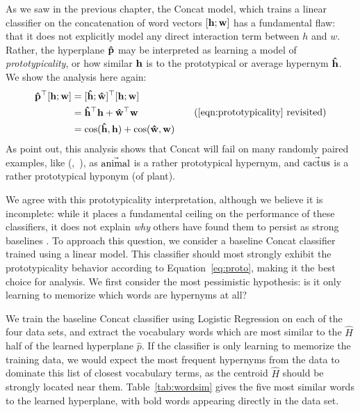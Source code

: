 As we saw in the previous chapter, the Concat model, which trains a linear
classifier on the concatenation of word vectors $[{\mathbf{h}}; {\mathbf{w}}]$ has a fundamental
flaw: that it does not explicitly model any direct interaction term between
$h$ and $w$. Rather, the hyperplane ${\mathbf{\hat p}}$ may be interpreted as learning
a model of {\em prototypicality}, or how similar ${\mathbf{h}}$ is to the prototypical
or average hypernym ${\mathbf{\hat h}}$. We show the analysis here again:
\begin{align}
  \begin{split}
  \vhatp^\top \wordpair & = \protopair^\top \wordpair\\
  & = \vhath^\top\vh + \vhatw^\top\vw\\
  & = \mbox{cos}(\vhath, \vh) + \mbox{cos}(\vhatw, \vw)
  \end{split}
\tag{\ref{eqn:prototypicality} revisited}
\end{align}
As  point out, this analysis shows that Concat will
fail on many randomly paired examples, like (,~), as
$\vec{\mbox{animal}}$ is a rather prototypical hypernym, and $\vec{\mbox{cactus}}$ is
a rather prototypical hyponym (of plant).

We agree with this prototypicality interpretation, although we believe it is incomplete:
while it places a fundamental ceiling on the performance of these classifiers, it
does not explain {\em why} others have found them to persist as strong
baselines
\cite{weeds:2014:coling,roller:2014:coling,kruszewski:2015:tacl,vylomova:2016:acl}.
To approach this question, we consider a baseline Concat classifier trained
using a linear model. This classifier should most strongly exhibit the prototypicality
behavior according to Equation~\ref{eq:proto}, making it the best
choice for analysis. We first consider the most pessimistic hypothesis: is it
only learning to memorize which words are hypernyms at all?

We train the baseline Concat classifier using Logistic Regression on each of
the four data sets, and extract the vocabulary words which are most similar to
the $\hat H$ half of the learned hyperplane $\hat p$. If the classifier is only
learning to memorize the training data, we would expect the most frequent
hypernyms from the data to dominate this list of closest vocabulary terms, as
the centroid $\hat H$ should be strongly located near them.
Table~\ref{tab:wordsim} gives the five most similar words to the learned
hyperplane, with bold words appearing directly in the data set.

